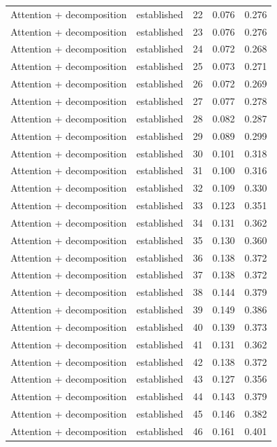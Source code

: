 \begin{tabular}{llrrr}
Attention + decomposition & established & 22 & 0.076 & 0.276 \\
Attention + decomposition & established & 23 & 0.076 & 0.276 \\
Attention + decomposition & established & 24 & 0.072 & 0.268 \\
Attention + decomposition & established & 25 & 0.073 & 0.271 \\
Attention + decomposition & established & 26 & 0.072 & 0.269 \\
Attention + decomposition & established & 27 & 0.077 & 0.278 \\
Attention + decomposition & established & 28 & 0.082 & 0.287 \\
Attention + decomposition & established & 29 & 0.089 & 0.299 \\
Attention + decomposition & established & 30 & 0.101 & 0.318 \\
Attention + decomposition & established & 31 & 0.100 & 0.316 \\
Attention + decomposition & established & 32 & 0.109 & 0.330 \\
Attention + decomposition & established & 33 & 0.123 & 0.351 \\
Attention + decomposition & established & 34 & 0.131 & 0.362 \\
Attention + decomposition & established & 35 & 0.130 & 0.360 \\
Attention + decomposition & established & 36 & 0.138 & 0.372 \\
Attention + decomposition & established & 37 & 0.138 & 0.372 \\
Attention + decomposition & established & 38 & 0.144 & 0.379 \\
Attention + decomposition & established & 39 & 0.149 & 0.386 \\
Attention + decomposition & established & 40 & 0.139 & 0.373 \\
Attention + decomposition & established & 41 & 0.131 & 0.362 \\
Attention + decomposition & established & 42 & 0.138 & 0.372 \\
Attention + decomposition & established & 43 & 0.127 & 0.356 \\
Attention + decomposition & established & 44 & 0.143 & 0.379 \\
Attention + decomposition & established & 45 & 0.146 & 0.382 \\
Attention + decomposition & established & 46 & 0.161 & 0.401 \\

\end{tabular}
